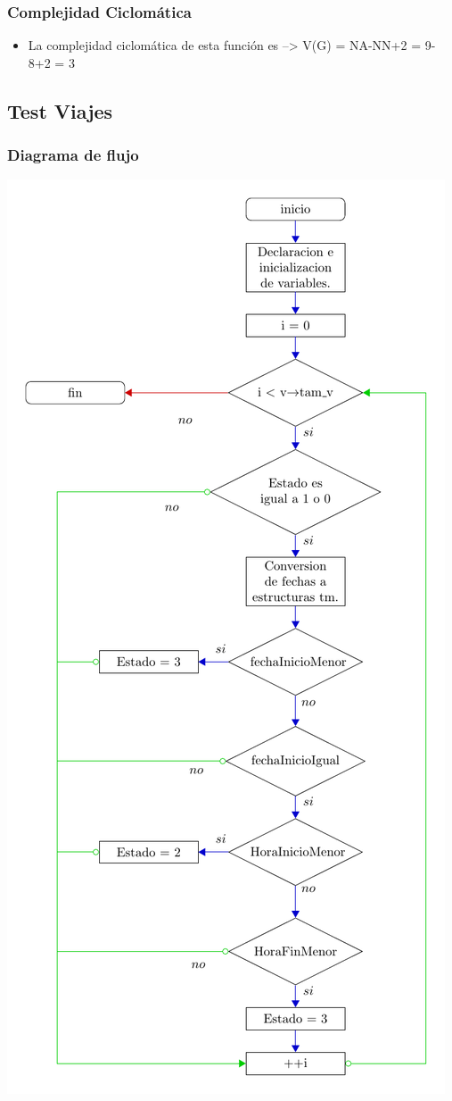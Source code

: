 \subsubsection{Complejidad Ciclomática}
\begin{itemize}
\item La complejidad ciclomática de esta función es --> V(G) = NA-NN+2 = 9-8+2 = 3
\end{itemize}
\subsection{Test Viajes}
\subsubsection{Diagrama de flujo}
\includegraphics[width=\textwidth, angle=0,scale=0.68]{dep/flujoupviajes.pdf}
